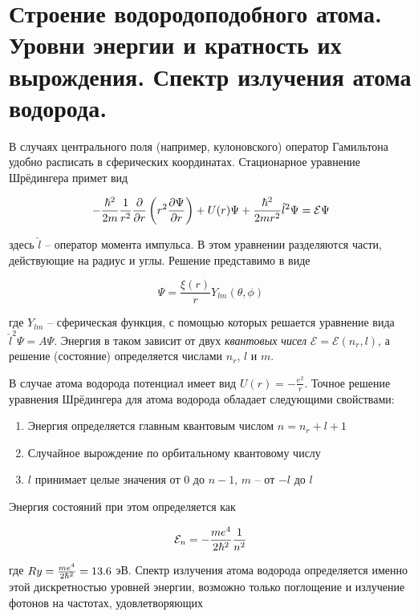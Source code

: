 \section{Строение водородоподобного атома. Уровни энергии и кратность их вырождения. Спектр излучения атома водорода.}

В случаях центрального поля (например, кулоновского) оператор Гамильтона удобно расписать в сферических координатах. Стационарное уравнение Шрёдингера примет вид

\begin{equation}
    - \frac{\hbar^2}{2 m} \frac{1}{r^2} \frac{\partial}{\partial r} \left( r^2 \frac{\partial \Psi}{\partial r} \right) + U(r) \Psi + \frac{\hbar^2}{2 m r^2} \hat{l}^2 \Psi = \mathcal{E} \Psi
\end{equation}

\noindent
здесь $\hat{l}$ -- оператор момента импульса. В этом уравнении разделяются части, действующие на радиус и углы. Решение представимо в виде

\begin{equation}
    \Psi = \frac{\xi (r)}{r} Y_{l m} (\theta, \phi)
\end{equation}

\noindent
где $Y_{l m}$ -- сферическая функция, с помощью которых решается уравнение вида $\hat{l}^2 \Psi = A \Psi$. Энергия в таком зависит от двух \textit{квантовых чисел} $\mathcal{E} = \mathcal{E} (n_r, l)$, а решение (состояние) определяется числами $n_r$, $l$ и $m$.

В случае атома водорода потенциал имеет вид $U (r) = - \frac{e^2}{r}$. Точное решение уравнения Шрёдингера для атома водорода обладает следующими свойствами:

\begin{enumerate}
    \item Энергия определяется главным квантовым числом $n = n_r + l + 1$
    \item Случайное вырождение по орбитальному квантовому числу
    \item $l$ принимает целые значения от $0$ до $n - 1$,  $m$ -- от $- l$ до $l$
\end{enumerate}

Энергия состояний при этом определяется как 

\begin{equation}
    \mathcal{E}_n = - \frac{m e^4}{2 \hbar^2} \frac{1}{n^2}
\end{equation}

\noindent
где $Ry = \frac{m e^4}{2 \hbar^2} = 13.6$ эВ. Спектр излучения атома водорода определяется именно этой дискретностью уровней энергии, возможно только поглощение и излучение фотонов на частотах, удовлетворяющих

